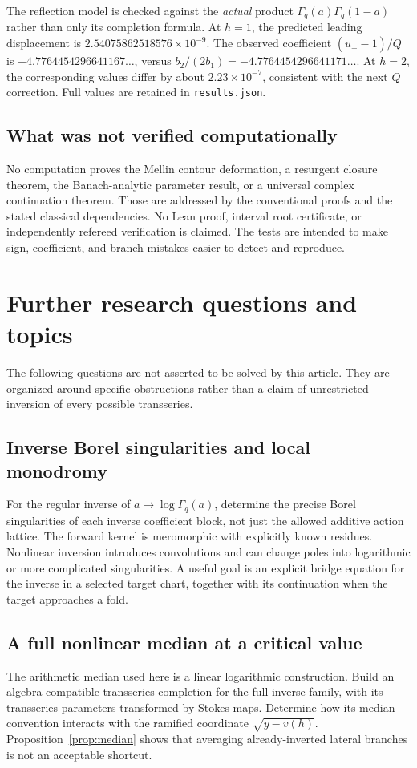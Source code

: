 \documentclass[11pt,a4paper]{article}
\numberwithin{equation}{section}
\theoremstyle{definition}
\theoremstyle{remark}\newtheorem{remark}[theorem]{Remark}
\begin{document}
The reflection model is checked against the \emph{actual} product
$\Gamma_q(a)\Gamma_q(1-a)$ rather than only its completion formula.
At $h=1$, the predicted leading displacement is
$2.54075862518576\times10^{-9}$. The observed coefficient
$(u_+-1)/Q$ is $-4.7764454296641167\ldots$, versus
$b_2/(2b_1)=-4.7764454296641171\ldots$. At $h=2$, the corresponding
values differ by about $2.23\times10^{-7}$, consistent with the next
$Q$ correction. Full values are retained in \texttt{results.json}.

\subsection{What was not verified computationally}
No computation proves the Mellin contour deformation, a resurgent
closure theorem, the Banach-analytic parameter result, or a universal
complex continuation theorem. Those are addressed by the conventional
proofs and the stated classical dependencies. No Lean proof, interval
root certificate, or independently refereed verification is claimed.
The tests are intended to make sign, coefficient, and branch mistakes
easier to detect and reproduce.

\section{Further research questions and topics}
\label{sec:further}

The following questions are not asserted to be solved by this article.
They are organized around specific obstructions rather than a claim of
unrestricted inversion of every possible transseries.

\subsection{Inverse Borel singularities and local monodromy}
For the regular inverse of $a\mapsto\log\Gamma_q(a)$, determine the
precise Borel singularities of each inverse coefficient block, not just
the allowed additive action lattice. The forward kernel is meromorphic
with explicitly known residues. Nonlinear inversion introduces
convolutions and can change poles into logarithmic or more complicated
singularities. A useful goal is an explicit bridge equation for the
inverse in a selected target chart, together with its continuation when
the target approaches a fold.

\subsection{A full nonlinear median at a critical value}
The arithmetic median used here is a linear logarithmic construction.
Build an algebra-compatible transseries completion for the full inverse
family, with its transseries parameters transformed by Stokes maps.
Determine how its median convention interacts with the ramified
coordinate $\sqrt{y-v(h)}$. Proposition~\ref{prop:median} shows that
averaging already-inverted lateral branches is not an acceptable shortcut.
\end{document}
